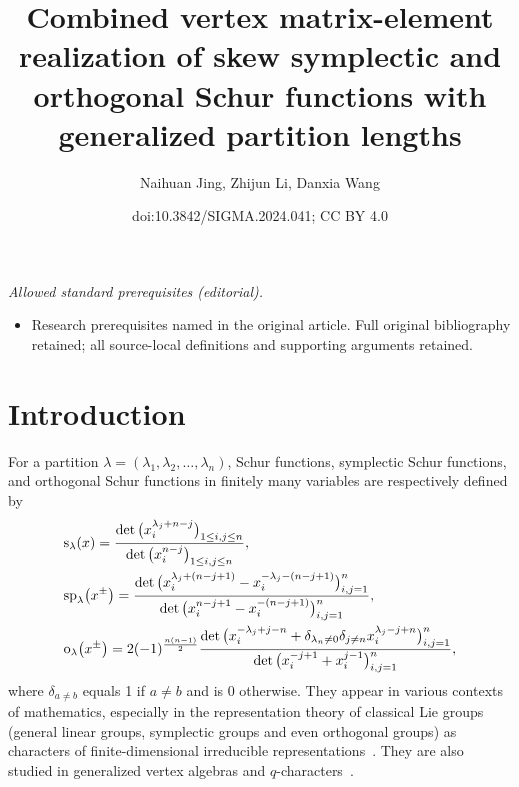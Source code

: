 \documentclass[10pt,a4paper]{amsart}
\title{Combined vertex matrix-element realization of skew symplectic and orthogonal Schur functions with generalized partition lengths}
\author{Naihuan Jing, Zhijun Li, Danxia Wang}
\date{doi:10.3842/SIGMA.2024.041; CC BY 4.0}
\numberwithin{equation}{section}
\begin{document}
\maketitle
\noindent\textit{Allowed standard prerequisites (editorial).}\begin{itemize}
\item Research prerequisites named in the original article. Full original bibliography retained; all source-local definitions and supporting arguments retained.
\end{itemize}\medskip
\section{Introduction}

For a partition $\lambda=(\lambda_1,\lambda_2,\ldots,\lambda_n)$, Schur functions, symplectic Schur functions, and orthogonal Schur functions in finitely many variables are respectively defined by~\cite{Mac1995,Me2019,Sta1999,Su1990}
\begin{align}
\label{e:s50}&{\rm s}_\lambda(x)=\frac{\det\big(x^{\lambda_j+n-j}_i\big)_{1\leq i,j\leq n}}{\det\big(x^{n-j}_i\big)_{1\leq i,j\leq n}},\\
\label{e:sp50}&{\rm sp}_\lambda\big(x^{\pm}\big)=\frac{\det\big(x^{\lambda_j+(n-j+1)}_i-x^{-\lambda_j-(n-j+1)}_i\big)^n_{i,j=1}}{\det\big(x^{n-j+1}_i-x^{-(n-j+1)}_i\big)^n_{i,j=1}},\\
\label{e:o50}&{\rm o}_\lambda\big(x^{\pm}\big)=2(-1)^{\frac{n(n-1)}{2}}\frac{\det\big(x^{-\lambda_j+j-n}_i+\delta_{\lambda_n\neq0}\delta_{j\neq n}x^{\lambda_j-j+n}_i\big)^n_{i,j=1}}{\det\big(x^{-j+1}_i+x^{j-1}_i\big)^n_{i,j=1}},
\end{align}
where $\delta_{a\neq b}$ equals 1 if $a\neq b$ and is $0$ otherwise.
They appear in various contexts of mathematics, especially in the representation theory of classical Lie groups (general linear groups, symplectic groups and
even orthogonal groups) as characters of finite-dimensional irreducible representations~\cite{KT1987,Lw1950,Su1990,Wey1946}. They are also
studied in generalized vertex algebras and $q$-characters~\cite{CG2020, LTW2016}.
\end{document}
